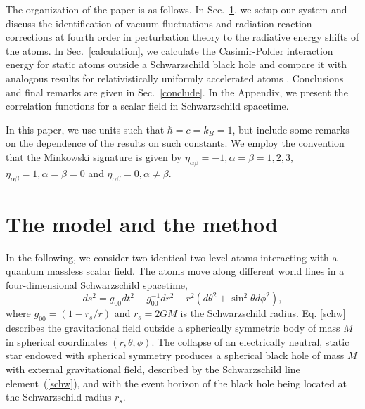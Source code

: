 \documentclass[twocolumn,prd,aps,showpacs,amsmath,amssymb]{revtex4-1}
\begin{document}
The organization of the paper is as follows. In Sec.~\ref{model}, we
setup our system and discuss the identification of vacuum
fluctuations and radiation reaction corrections at fourth order in
perturbation theory to the radiative energy shifts of the atoms. In
Sec.~\ref{calculation}, we calculate the Casimir-Polder interaction
energy for static atoms outside a Schwarzschild black hole and 
compare it with analogous results for relativistically uniformly
accelerated atoms \cite{marino}. Conclusions and final remarks are given in
Sec.~\ref{conclude}.  
In the Appendix, we present the correlation functions for a scalar field
in Schwarzschild spacetime. 

In this paper, we use units such that
$\hbar = c = k_B = 1$, but include some remarks on the dependence
of the results on such constants. We employ the convention that the Minkowski
signature is given by $\eta_{\alpha\beta} = -1, \alpha=\beta=1,2,3$,
$\eta_{\alpha\beta} = 1, \alpha=\beta=0$ and $\eta_{\alpha\beta} =
0,\alpha \neq \beta$.  


\section{The model and the method}
\label{model}

In the following, we consider two identical two-level atoms
interacting with a quantum massless scalar field. The atoms move along
different world lines in a four-dimensional Schwarzschild spacetime, 
\begin{equation}
ds^2 = g_{00}dt^2 -{g^{-1}_{00}}dr^2 -r^2 (d\theta^2 + \sin^2\theta d\phi^2), 
\label{schw}
\end{equation}
%
where $g_{00}=\left(1 - r_{s}/r\right)$ and  $r_{s} = 2GM$ is the Schwarzschild radius.
Eq. \eqref{schw} describes the gravitational field outside a spherically symmetric body
of mass $M$ in spherical coordinates $(r,\theta,\phi)$. The collapse
of an electrically neutral, static star endowed with spherical
symmetry produces a spherical black hole of mass $M$ with external
gravitational field, described by the Schwarzschild line
element~(\ref{schw}), and with the event horizon of the black hole
being located at the Schwarzschild radius $r_{s}$.   
\end{document}

